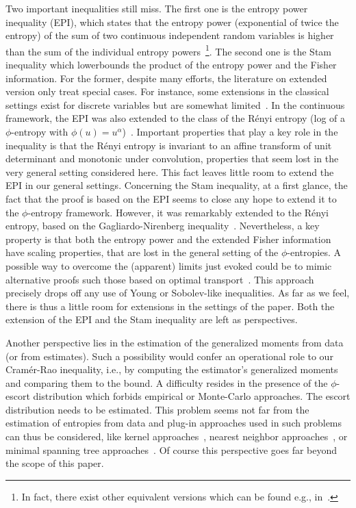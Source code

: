 \documentclass[entropy,article,submit,moreauthors,pdftex]{Definitions/mdpi}
\begin{document}
Two  important inequalities  still  miss. The  first one  is  the entropy  power
inequality (EPI), which states that the  entropy power (exponential of twice the
entropy) of  the sum of  two continuous  independent random variables  is higher
than the  sum of  the individual entropy  powers~\footnote{In fact,  there exist
other  equivalent   versions  which   can  be  found   e.g.,  in~\cite{CovTho06,
  DemCov91}.}.   The second  one is  the Stam  inequality which  lowerbounds the
product of the entropy power and the Fisher information. For the former, despite
many efforts, the literature on extended  version only treat special cases.  For
instance, some extensions in the classical settings exist for discrete variables
but are somewhat limited~\cite{HarVig03,  JohYu10, HagAbb14}.  In the continuous
framework, the EPI was also extended to the class of the R\'enyi entropy (log of
a   $\phi$-entropy  with   $\phi(u)  =   u^\alpha$)~\cite{BobChi15}.   Important
properties that play a key role in the inequality is that the R\'enyi entropy is
invariant  to  an affine  transform  of  unit  determinant and  monotonic  under
convolution, properties  that seem lost  in the very general  setting considered
here. This fact  leaves little room to  extend the EPI in  our general settings.
Concerning the Stam  inequality, at a first  glance, the fact that  the proof is
based on  the EPI seems  to close  any hope to  extend it to  the $\phi$-entropy
framework. However, it was remarkably extended  to the R\'enyi entropy, based on
the   Gagliardo-Nirenberg    inequality~\cite{Ber12:06_1,   LutYan05,   LutLv12,
  ZozPue17}. Nevertheless, a key property is that both the entropy power and the
extended  Fisher information  have  scaling  properties, that  are  lost in  the
general  setting  of the  $\phi$-entropies.   A  possible  way to  overcome  the
(apparent) limits  just evoked could be  to mimic alternative proofs  such those
based on optimal transport~\cite{Rio17}.  This  approach precisely drops off any
use of Young  or Sobolev-like inequalities. As  far as we feel, there  is thus a
little room for extensions in the settings  of the paper.  Both the extension of
the EPI and the Stam inequality are left as perspectives.

Another perspective lies in the estimation  of the generalized moments from data
(or from estimates). Such a possibility  would confer an operational role to our
Cram\'er-Rao inequality, i.e., by  computing the estimator's generalized moments
and comparing  them to the  bound. A difficulty resides  in the presence  of the
$\phi$-escort    distribution   which    forbids   empirical    or   Monte-Carlo
approaches. The escort  distribution needs to be estimated.   This problem seems
not far from  the estimation of entropies from data  and plug-in approaches used
in such  problems can  thus be  considered, like  kernel approaches~\cite{Ros56,
  Par62,  BeiDud97}, nearest  neighbor approaches~\cite{LeoPro08,  BeiDud97}, or
minimal spanning tree approaches~\cite{HerMa02}. Of course this perspective goes
far beyond the scope of this paper.
\end{document}
